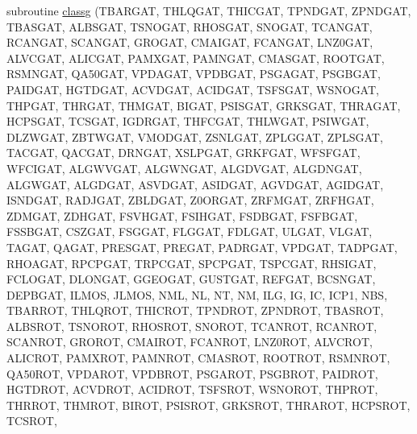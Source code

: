 \begin{DoxyCompactItemize}
subroutine \hyperlink{CLASSG_8f_aba1f0c497e451788b07234733ce424e5}{classg} (T\+B\+A\+R\+G\+A\+T, T\+H\+L\+Q\+G\+A\+T, T\+H\+I\+C\+G\+A\+T, T\+P\+N\+D\+G\+A\+T, Z\+P\+N\+D\+G\+A\+T, T\+B\+A\+S\+G\+A\+T, A\+L\+B\+S\+G\+A\+T, T\+S\+N\+O\+G\+A\+T, R\+H\+O\+S\+G\+A\+T, S\+N\+O\+G\+A\+T, T\+C\+A\+N\+G\+A\+T, R\+C\+A\+N\+G\+A\+T, S\+C\+A\+N\+G\+A\+T, G\+R\+O\+G\+A\+T, C\+M\+A\+I\+G\+A\+T, F\+C\+A\+N\+G\+A\+T, L\+N\+Z0\+G\+A\+T, A\+L\+V\+C\+G\+A\+T, A\+L\+I\+C\+G\+A\+T, P\+A\+M\+X\+G\+A\+T, P\+A\+M\+N\+G\+A\+T, C\+M\+A\+S\+G\+A\+T, R\+O\+O\+T\+G\+A\+T, R\+S\+M\+N\+G\+A\+T, Q\+A50\+G\+A\+T, V\+P\+D\+A\+G\+A\+T, V\+P\+D\+B\+G\+A\+T, P\+S\+G\+A\+G\+A\+T, P\+S\+G\+B\+G\+A\+T, P\+A\+I\+D\+G\+A\+T, H\+G\+T\+D\+G\+A\+T, A\+C\+V\+D\+G\+A\+T, A\+C\+I\+D\+G\+A\+T, T\+S\+F\+S\+G\+A\+T, W\+S\+N\+O\+G\+A\+T, T\+H\+P\+G\+A\+T, T\+H\+R\+G\+A\+T, T\+H\+M\+G\+A\+T, B\+I\+G\+A\+T, P\+S\+I\+S\+G\+A\+T, G\+R\+K\+S\+G\+A\+T, T\+H\+R\+A\+G\+A\+T, H\+C\+P\+S\+G\+A\+T, T\+C\+S\+G\+A\+T, I\+G\+D\+R\+G\+A\+T, T\+H\+F\+C\+G\+A\+T, T\+H\+L\+W\+G\+A\+T, P\+S\+I\+W\+G\+A\+T, D\+L\+Z\+W\+G\+A\+T, Z\+B\+T\+W\+G\+A\+T, V\+M\+O\+D\+G\+A\+T, Z\+S\+N\+L\+G\+A\+T, Z\+P\+L\+G\+G\+A\+T, Z\+P\+L\+S\+G\+A\+T, T\+A\+C\+G\+A\+T, Q\+A\+C\+G\+A\+T, D\+R\+N\+G\+A\+T, X\+S\+L\+P\+G\+A\+T, G\+R\+K\+F\+G\+A\+T, W\+F\+S\+F\+G\+A\+T, W\+F\+C\+I\+G\+A\+T, A\+L\+G\+W\+V\+G\+A\+T, A\+L\+G\+W\+N\+G\+A\+T, A\+L\+G\+D\+V\+G\+A\+T, A\+L\+G\+D\+N\+G\+A\+T, A\+L\+G\+W\+G\+A\+T, A\+L\+G\+D\+G\+A\+T, A\+S\+V\+D\+G\+A\+T, A\+S\+I\+D\+G\+A\+T, A\+G\+V\+D\+G\+A\+T, A\+G\+I\+D\+G\+A\+T, I\+S\+N\+D\+G\+A\+T, R\+A\+D\+J\+G\+A\+T, Z\+B\+L\+D\+G\+A\+T, Z0\+O\+R\+G\+A\+T, Z\+R\+F\+M\+G\+A\+T, Z\+R\+F\+H\+G\+A\+T, Z\+D\+M\+G\+A\+T, Z\+D\+H\+G\+A\+T, F\+S\+V\+H\+G\+A\+T, F\+S\+I\+H\+G\+A\+T, F\+S\+D\+B\+G\+A\+T, F\+S\+F\+B\+G\+A\+T, F\+S\+S\+B\+G\+A\+T, C\+S\+Z\+G\+A\+T, F\+S\+G\+G\+A\+T, F\+L\+G\+G\+A\+T, F\+D\+L\+G\+A\+T, U\+L\+G\+A\+T, V\+L\+G\+A\+T, T\+A\+G\+A\+T, Q\+A\+G\+A\+T, P\+R\+E\+S\+G\+A\+T, P\+R\+E\+G\+A\+T, P\+A\+D\+R\+G\+A\+T, V\+P\+D\+G\+A\+T, T\+A\+D\+P\+G\+A\+T, R\+H\+O\+A\+G\+A\+T, R\+P\+C\+P\+G\+A\+T, T\+R\+P\+C\+G\+A\+T, S\+P\+C\+P\+G\+A\+T, T\+S\+P\+C\+G\+A\+T, R\+H\+S\+I\+G\+A\+T, F\+C\+L\+O\+G\+A\+T, D\+L\+O\+N\+G\+A\+T, G\+G\+E\+O\+G\+A\+T, G\+U\+S\+T\+G\+A\+T, R\+E\+F\+G\+A\+T, B\+C\+S\+N\+G\+A\+T, D\+E\+P\+B\+G\+A\+T, I\+L\+M\+O\+S, J\+L\+M\+O\+S, N\+M\+L, N\+L, N\+T, N\+M, I\+L\+G, I\+G, I\+C, I\+C\+P1, N\+B\+S, T\+B\+A\+R\+R\+O\+T, T\+H\+L\+Q\+R\+O\+T, T\+H\+I\+C\+R\+O\+T, T\+P\+N\+D\+R\+O\+T, Z\+P\+N\+D\+R\+O\+T, T\+B\+A\+S\+R\+O\+T, A\+L\+B\+S\+R\+O\+T, T\+S\+N\+O\+R\+O\+T, R\+H\+O\+S\+R\+O\+T, S\+N\+O\+R\+O\+T, T\+C\+A\+N\+R\+O\+T, R\+C\+A\+N\+R\+O\+T, S\+C\+A\+N\+R\+O\+T, G\+R\+O\+R\+O\+T, C\+M\+A\+I\+R\+O\+T, F\+C\+A\+N\+R\+O\+T, L\+N\+Z0\+R\+O\+T, A\+L\+V\+C\+R\+O\+T, A\+L\+I\+C\+R\+O\+T, P\+A\+M\+X\+R\+O\+T, P\+A\+M\+N\+R\+O\+T, C\+M\+A\+S\+R\+O\+T, R\+O\+O\+T\+R\+O\+T, R\+S\+M\+N\+R\+O\+T, Q\+A50\+R\+O\+T, V\+P\+D\+A\+R\+O\+T, V\+P\+D\+B\+R\+O\+T, P\+S\+G\+A\+R\+O\+T, P\+S\+G\+B\+R\+O\+T, P\+A\+I\+D\+R\+O\+T, H\+G\+T\+D\+R\+O\+T, A\+C\+V\+D\+R\+O\+T, A\+C\+I\+D\+R\+O\+T, T\+S\+F\+S\+R\+O\+T, W\+S\+N\+O\+R\+O\+T, T\+H\+P\+R\+O\+T, T\+H\+R\+R\+O\+T, T\+H\+M\+R\+O\+T, B\+I\+R\+O\+T, P\+S\+I\+S\+R\+O\+T, G\+R\+K\+S\+R\+O\+T, T\+H\+R\+A\+R\+O\+T, H\+C\+P\+S\+R\+O\+T, T\+C\+S\+R\+O\+T, 
\end{DoxyCompactItemize}
